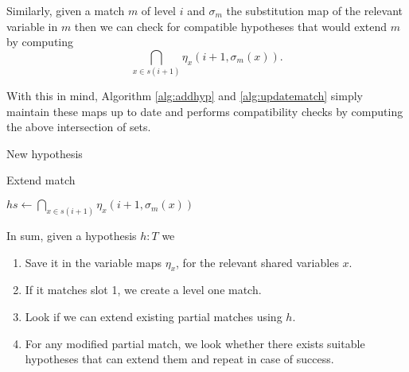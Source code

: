 \documentclass[runningheads]{llncs}
\begin{document}
Similarly, given a match $m$ of level $i$ and $\sigma_m$ the substitution map of the relevant  variable in $m$ then we can check for compatible hypotheses that would extend $m$ by computing
\[
  \bigcap_{x \in s(i + 1)} \eta_x \left(i + 1, \sigma_m(x)\right).
\]

With this in mind, Algorithm \ref{alg:addhyp} and \ref{alg:updatematch} simply maintain these maps up to date and performs compatibility checks by computing the above intersection of sets.

\begin{algorithm}
    \caption{New hypothesis}\label{alg:addhyp}
\end{algorithm}

\begin{algorithm}
    \caption{Extend match}\label{alg:updatematch}
        $hs \gets \bigcap_{x \in s(i + 1)} \eta_x \left(i + 1, \sigma_m(x)\right)$ \\
\end{algorithm}

In sum, given a hypothesis $h :T$ we
\begin{enumerate}
\item Save it in the variable maps $\eta_x$, for the relevant shared variables $x$.
\item If it matches slot 1, we create a level one match.
\item Look if we can extend existing partial matches using $h$.
\item For any modified partial match, we look whether there exists suitable hypotheses that can extend them and repeat in case of success.
\end{enumerate}
\end{document}
